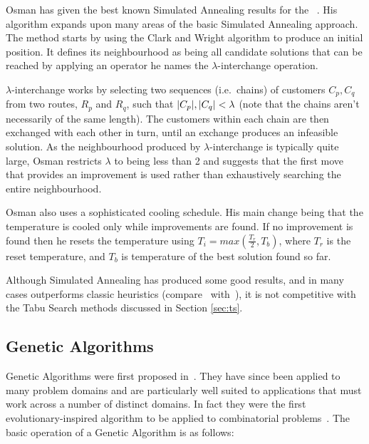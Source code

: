 Osman has given the best known Simulated Annealing results for the \VRP~\cite{Osman:1993}. His algorithm expands upon many areas of the basic Simulated Annealing approach. The method starts by using the Clark and Wright algorithm to produce an initial position. It defines its neighbourhood as being all candidate solutions that can be reached by applying an operator he names the $\lambda$-interchange operation.

$\lambda$-interchange works by selecting two sequences (i.e.~chains) of customers $C_p, C_q$ from two routes, $R_p$ and $R_q$, such that $|C_p|, |C_q| < \lambda$ (note that the chains aren't necessarily of the same length). The customers within each chain are then exchanged with each other in turn, until an exchange produces an infeasible solution. As the neighbourhood produced by $\lambda$-interchange is typically quite large, Osman restricts $\lambda$ to being less than 2 and suggests that the first move that provides an improvement is used rather than exhaustively searching the entire neighbourhood.


Osman also uses a sophisticated cooling schedule. His main change being that the temperature is cooled only while improvements are found. If no improvement is found then he resets the temperature using $T_i = max(\frac{T_r}{2}, T_b)$, where $T_r$ is the reset temperature, and $T_b$ is temperature of the best solution found so far. 

Although Simulated Annealing has produced some good results, and in many cases outperforms classic heuristics (compare~\cite{Laporte:1999} with~\cite{GLP:1999}), it is not competitive with the Tabu Search methods discussed in Section \ref{sec:ts}.

\subsection{Genetic Algorithms}

Genetic Algorithms were first proposed in~\cite{Holland:1975}. They have since been applied to many problem domains and are particularly well suited to applications that must work across a number of distinct domains. In fact they were the first evolutionary-inspired algorithm to be applied to combinatorial problems~\cite{Potvin:2009}. The basic operation of a Genetic Algorithm is as follows:

